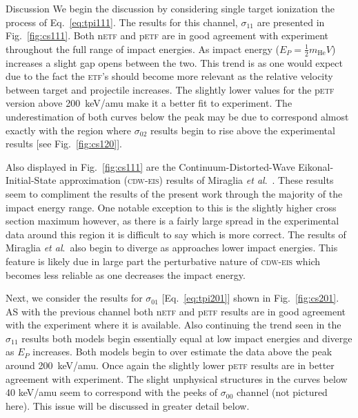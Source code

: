 \documentclass[aps, pra, reprint, groupedaddress, amsfonts,
               amsmath, amssymb, showpacs, nofootinbib]{revtex4-1}
\begin{document}
\begin{section}{Discussion \label{sec:disc}}
   We begin the discussion by considering single target ionization the process of Eq.~\eqref{eq:tpi111}.
   The results for this channel, $\sigma_{11}$ are presented in Fig.~\ref{fig:cs111}. Both n\textsc{etf}
   and p\textsc{etf} are in good agreement with experiment throughout the full range of impact energies.
   As impact energy ($E_P = \frac{1}{2} m_\textrm{He} V$) increases a slight gap opens between the two.
   This trend is as one would expect due to the fact the \textsc{etf}'s should become more relevant as
   the relative velocity between target and projectile increases. The slightly lower values for the
   p\textsc{etf} version above 200~keV/amu make it a better fit to experiment. The underestimation of
   both curves below the peak may be due to correspond almost exactly with the region where
   $\sigma_{02}$ results begin to rise above the experimental results [see Fig.~\ref{fig:cs120}].

   Also displayed in Fig.~\ref{fig:cs111} are the Continuum-Distorted-Wave Eikonal-Initial-State
   approximation (\textsc{cdw-eis}) results of Miraglia \textit{et al}.~\cite{MG-10}. These results seem
   to compliment the results of the present work through the majority of the impact energy range. One
   notable exception to this is the slightly higher cross section maximum however, as there is a fairly
   large spread in the experimental data around this region it is difficult to say which is more
   correct. The results of Miraglia \textit{et al}.\ also begin to diverge as approaches lower impact
   energies. This feature is likely due in large part the perturbative nature of \textsc{cdw-eis} which
   becomes less reliable as one decreases the impact energy.

   Next, we consider the results for $\sigma_{01}$ [Eq.~\eqref{eq:tpi201}] shown in Fig.~\ref{fig:cs201}.
   AS with the previous channel both n\textsc{etf} and p\textsc{etf} results are in good agreement with
   the experiment where it is available. Also continuing the trend seen in the $\sigma_{11}$ results
   both models begin essentially equal at low impact energies and diverge as $E_P$ increases. Both
   models begin to over estimate the data above the peak around 200~keV/amu. Once again the slightly
   lower p\textsc{etf} results are in better agreement with experiment. The slight unphysical structures
   in the curves below 40 keV/amu seem to correspond with the peeks of $\sigma_{00}$ channel (not
   pictured here). This issue will be discussed in greater detail below.


\end{section}
\end{document}

